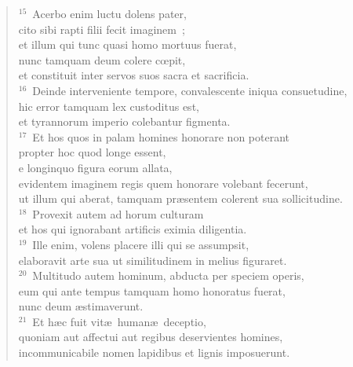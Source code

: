 \begin{verse}${}^{15}$~Acerbo enim luctu dolens pater,\\ cito sibi rapti filii fecit imaginem~;\\ et illum qui tunc quasi homo mortuus fuerat,\\ nunc tamquam deum colere cœpit,\\ et constituit inter servos suos sacra et sacrificia.\\
${}^{16}$~Deinde interveniente tempore, convalescente iniqua consuetudine,\\ hic error tamquam lex custoditus est,\\ et tyrannorum imperio colebantur figmenta.\\
${}^{17}$~Et hos quos in palam homines honorare non poterant\\ propter hoc quod longe essent,\\ e longinquo figura eorum allata,\\ evidentem imaginem regis quem honorare volebant fecerunt,\\ ut illum qui aberat, tamquam pr\ae sentem colerent sua sollicitudine.\\
${}^{18}$~Provexit autem ad horum culturam\\ et hos qui ignorabant artificis eximia diligentia.\\
${}^{19}$~Ille enim, volens placere illi qui se assumpsit,\\ elaboravit arte sua ut similitudinem in melius figuraret.\\
${}^{20}$~Multitudo autem hominum, abducta per speciem operis,\\ eum qui ante tempus tamquam homo honoratus fuerat,\\ nunc deum \ae stimaverunt.\\
${}^{21}$~Et h\ae c fuit vit\ae\ human\ae\ deceptio,\\ quoniam aut affectui aut regibus deservientes homines,\\ incommunicabile nomen lapidibus et lignis imposuerunt.\end{verse}


